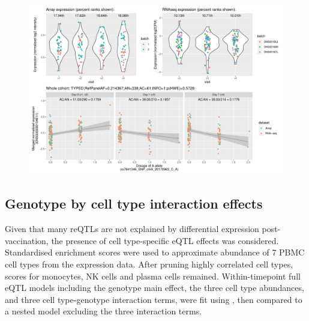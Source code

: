 \begin{figure}
    \centering
    \includegraphics[width=1.0\textwidth,page=1]{mainmatter/figures/chapter_03/plot_dge_eqtl_genotypes.ENSG00000104611,rs7841346_SNP_chr8_20170963_C_A.pdf}
    \caption{}
    \label{fig:hird_eQTL_ploteQTL_SH2D4A}
\end{figure}

\subsection{Genotype by cell type interaction effects}

Given that many \glspl{reQTL} are not explained by differential expression post-vaccination, the presence of cell type-specific \gls{eQTL} effects was considered.
Standardised  enrichment scores were used to approximate abundance of 7 \gls{PBMC} cell types from the expression data.
After pruning highly correlated cell types, scores for monocytes, \gls{NK} cells and plasma cells remained.
Within-timepoint full \gls{eQTL} models including the genotype main effect, the three cell type abundances, and three cell type-genotype interaction terms, were fit using , 
then compared to a nested model excluding the three interaction terms.

